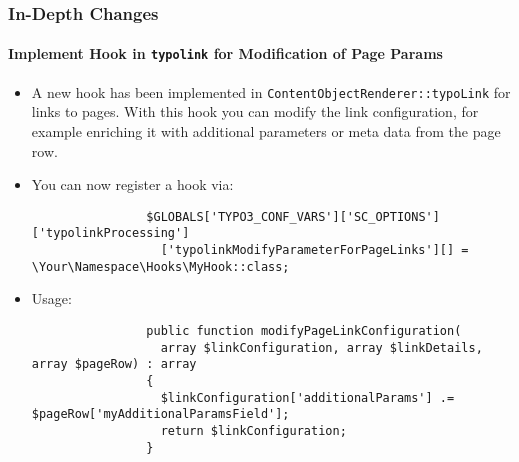 \begin{frame}[fragile]
	\frametitle{In-Depth Changes}
	\framesubtitle{Implement Hook in \texttt{typolink} for Modification of Page Params}

	\lstset{basicstyle=\tiny\ttfamily}

	\begin{itemize}
		\item A new hook has been implemented in \texttt{ContentObjectRenderer::typoLink} for links to pages.
			With this hook you can modify the link configuration, for example enriching it with additional
			parameters or meta data from the page row.

		\item You can now register a hook via:

			\begin{lstlisting}
				$GLOBALS['TYPO3_CONF_VARS']['SC_OPTIONS']['typolinkProcessing']
				  ['typolinkModifyParameterForPageLinks'][] = \Your\Namespace\Hooks\MyHook::class;
			\end{lstlisting}

		\item Usage:

			\begin{lstlisting}
				public function modifyPageLinkConfiguration(
				  array $linkConfiguration, array $linkDetails, array $pageRow) : array
				{
				  $linkConfiguration['additionalParams'] .= $pageRow['myAdditionalParamsField'];
				  return $linkConfiguration;
				}
			\end{lstlisting}

	\end{itemize}

\end{frame}


